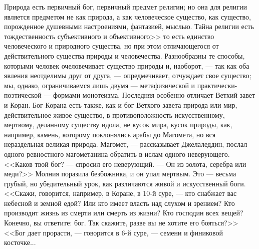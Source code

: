 \documentclass[12pt]{article}
\begin{document}
Природа есть первичный бог, первичный предмет религии; но она для религии является предметом не как природа, а как человеческое существо, как существо, порожденное душевными настроениями, фантазией, мыслью. Тайна религии есть тождественность субъективного и объективного>>  то есть единство человеческого и природного существа, но при этом отличающегося от действительного существа природы и человечества. Разнообразны те способы, которыми человек очеловечивает существо природы и, наоборот, --- так как оба явления неотделимы друг от друга, --- опредмечивает, отчуждает свое существо; мы, однако, ограничиваемся лишь двумя --- метафизической и практически-поэтической --- формами монотеизма. Последняя особенно отличает Ветхий завет и Коран. Бог Корана есть также, как и бог Ветхого завета природа или мир, действительное живое существо, в противоположность искусственному, мертвому, деланному существу идола, не кусок мира, кусок природы, как, например, камень, которому поклонялись арабы до Магомета, но вся нераздельная великая природа. Магомет, --- рассказывает Джелаледдин, послал одного ревностного магометанина обратить в ислам одного неверующего. <<Каков твой бог? --- спросил его неверующий. --- Он из золота, серебра или меди?>> Молния поразила безбожника, и он упал мертвым. Это --- весьма грубый, но убедительный урок, как различаются живой и искусственный боги. <<Скажи, говорится, например, в Коране, в 10-й суре, --- кто снабжает вас небесной и земной едой? Или кто имеет власть над слухом и зрением? Кто производит жизнь из смерти или смерть из жизни? Кто господин всех вещей? Конечно, вы ответите: бог. Так скажите, разве вы не хотите его бояться?>> <<Бог дает прорасти, --- говорится в 6-й суре, --- семени и финиковой косточке... 
\end{document}
